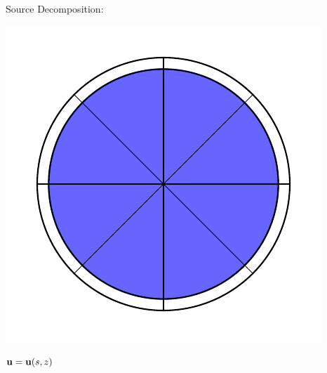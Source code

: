 \documentclass{article}
\renewcommand{\vec}[1]{\ensuremath{\mathbf{#1}}}
\begin{document}
\begin{center}
    \begin{minipage}[t]{0.4\paperwidth}
        Source Decomposition:\\
        \begin{minipage}[c]{0.1\paperwidth}
            \includegraphics[width=\textwidth]{radpat_mono.pdf}%
        \end{minipage}%
        \begin{minipage}[c]{0.4\paperwidth}
            $\scriptsize{\vec u = \vec u (s,z)}$ \\
        \end{minipage}
    

\end{minipage}
\end{center}
\end{document}

